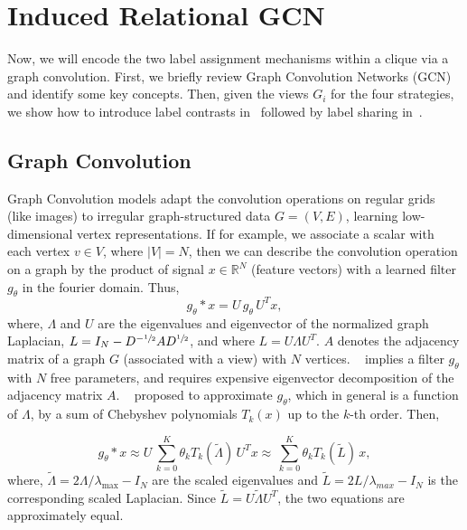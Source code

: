 \section{Induced Relational GCN}
\label{sec:gcn}
Now, we will encode the two label assignment mechanisms within a clique via a graph convolution. First, we briefly review Graph Convolution Networks (GCN) and identify some key concepts. Then, given the views $G_i$ for the four strategies, we show how to introduce label contrasts in~ followed by label sharing in~.

\subsection{Graph Convolution}
\label{subsec:graph}
Graph Convolution models adapt the convolution operations on regular grids (like images) to irregular graph-structured data $G = (V,E)$, learning low-dimensional vertex representations. If for example, we associate a scalar with each vertex $v \in V$, where $|V| = N$, then we can describe the convolution operation on a graph by the product of signal $x \in \mathbb{R}^N$ (feature vectors) with a learned filter $g_\theta$ in the fourier domain. Thus,
\begin{equation}
  g_\theta \ast x =  U \, g_\theta \, U^T x,
  \label{eq:basic_gcn}
\end{equation}
where, $\Lambda$ and $U$ are the eigenvalues and eigenvector of the normalized graph Laplacian, $L = I_N - D^{-\sfrac{1}{2}}AD^{\sfrac{1}{2}}$, and where $L = U \Lambda U^T$. $A$ denotes the adjacency matrix of a graph $G$ (associated with a view) with $N$ vertices. ~ implies a filter $g_\theta$ with $N$ free parameters, and requires expensive eigenvector decomposition of the adjacency matrix $A$. ~\citet{deferrard} proposed to approximate $g_\theta$, which in general is a function of $\Lambda$, by a sum of Chebyshev polynomials $T_k(x)$ up to the $k$-th order. Then,

\begin{equation}
  g_\theta \ast x \approx U \, \sum_{k=0}^K \theta_k T_k(\tilde{\Lambda}) \, U^T x \approx \, \sum_{k=0}^K \theta_k T_k(\tilde{L}) \, x,
  \label{eq:approx_gcn}
\end{equation}
where, $\tilde{\Lambda} = 2 \Lambda/ \lambda_{\max}- I_N$ are the scaled eigenvalues and $\tilde{L} = 2L/\lambda_{max} - I_N$ is the corresponding scaled Laplacian. Since $\tilde{L} = U \tilde{\Lambda} U^T$, the two equations are approximately equal.

